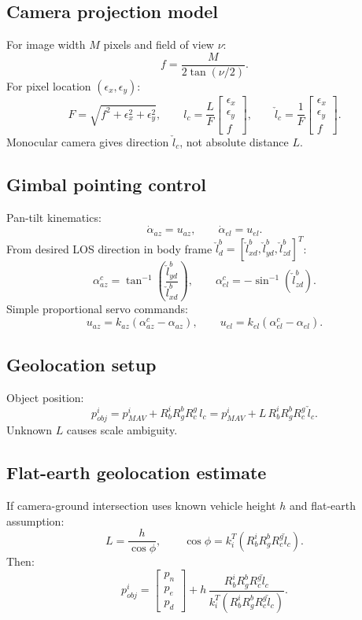 \documentclass[11pt,a4paper]{article}
\begin{document}
\subsection{Camera projection model}
For image width $M$ pixels and field of view $\nu$:
\[
f=\frac{M}{2\tan(\nu/2)}.
\]
For pixel location $(\epsilon_x,\epsilon_y)$:
\[
F=\sqrt{f^2+\epsilon_x^2+\epsilon_y^2},
\qquad
l_c=\frac{L}{F}\begin{bmatrix}\epsilon_x\\ \epsilon_y\\ f\end{bmatrix},
\qquad
\check l_c=\frac{1}{F}\begin{bmatrix}\epsilon_x\\ \epsilon_y\\ f\end{bmatrix}.
\]
Monocular camera gives direction $\check l_c$, not absolute distance $L$.

\subsection{Gimbal pointing control}
Pan-tilt kinematics:
\[
\dot\alpha_{az}=u_{az},\qquad \dot\alpha_{el}=u_{el}.
\]
From desired LOS direction in body frame $\check l_d^b=[\check l_{xd}^b,\check l_{yd}^b,\check l_{zd}^b]^T$:
\[
\alpha_{az}^c=\tan^{-1}\!\left(\frac{\check l_{yd}^b}{\check l_{xd}^b}\right),\qquad
\alpha_{el}^c=-\sin^{-1}(\check l_{zd}^b).
\]
Simple proportional servo commands:
\[
u_{az}=k_{az}(\alpha_{az}^c-\alpha_{az}),\qquad
u_{el}=k_{el}(\alpha_{el}^c-\alpha_{el}).
\]

\subsection{Geolocation setup}
Object position:
\[
p_{obj}^i=p_{MAV}^i+R_b^iR_g^bR_c^g\,l_c
=p_{MAV}^i+L\,R_b^iR_g^bR_c^g\,\check l_c.
\]
Unknown $L$ causes scale ambiguity.

\subsection{Flat-earth geolocation estimate}
If camera-ground intersection uses known vehicle height $h$ and flat-earth assumption:
\[
L=\frac{h}{\cos\phi},
\qquad
\cos\phi=k_i^T\left(R_b^iR_g^bR_c^g\check l_c\right).
\]
Then:
\[
p_{obj}^i
=
\begin{bmatrix}p_n\\p_e\\p_d\end{bmatrix}
+
h\,
\frac{R_b^iR_g^bR_c^g\check l_c}{k_i^T\left(R_b^iR_g^bR_c^g\check l_c\right)}.
\]
\end{document}
